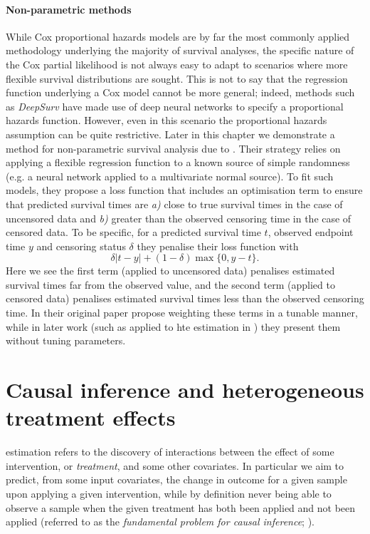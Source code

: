 \documentclass[../thesis.tex]{subfiles}
\begin{document}
\paragraph{Non-parametric methods} \label{sec:nonparametric}
While Cox proportional hazards models are by far the most commonly applied methodology underlying the majority of survival analyses, the specific nature of the Cox partial likelihood is not always easy to adapt to scenarios where more flexible survival distributions are sought. This is not to say that the regression function underlying a Cox model cannot be more general; indeed, methods such as \emph{DeepSurv} \citep{katzman_deepsurv_2018} have made use of deep neural networks to specify a proportional hazards function. However, even in this scenario the proportional hazards assumption can be quite restrictive. Later in this chapter we demonstrate a method for non-parametric survival analysis due to \citet{chapfuwa_adversarial_2018}. Their strategy relies on applying a flexible regression function to a known source of simple randomness (e.g. a neural network applied to a multivariate normal source). To fit such models, they propose a loss function that includes an optimisation term to ensure that predicted survival times are \emph{a)} close to true survival times in the case of uncensored data and \emph{b)} greater than the observed censoring time in the case of censored data. To be specific, for a predicted survival time $t$, observed endpoint time $y$ and censoring status $\delta$ they penalise their loss function with 
\[\delta |t-y| + (1-\delta)\max\{0, y - t\}. \]
Here we see the first term (applied to uncensored data) penalises estimated survival times far from the observed value, and the second term (applied to censored data) penalises estimated survival times less than the observed censoring time. In their original paper \citet{chapfuwa_adversarial_2018} propose weighting these terms in a tunable manner, while in later work (such as applied to \gls{hte} estimation in \citealp{chapfuwa_enabling_2021}) they present them without tuning parameters. 


\section{Causal inference and heterogeneous treatment effects \label{sec:hte}}
 estimation refers to the discovery of interactions between the effect of some intervention, or \emph{treatment}, and some other covariates. In particular we aim to predict, from some input covariates, the change in outcome for a given sample upon applying a given intervention, while by definition never being able to observe a sample when the given treatment has both been applied and not been applied (referred to as the \emph{fundamental problem for causal inference}; \citealp{holland_statistics_1986}). 
\end{document}
